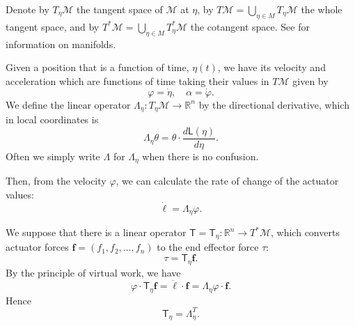 \documentclass[oneside,twocolumn,reqno]{amsart}
\begin{document}
Denote by $T_\eta \mathcal M$ the tangent space of $\mathcal M$ at $\eta$, by $T\mathcal M = \bigcup_{\eta\in M} T_\eta \mathcal M$ the whole tangent space, and by $T^*\mathcal M = \bigcup_{\eta\in M} T^*_\eta \mathcal M$ the cotangent space.  See \cite{lee} for information on manifolds.

Given a position that is a function of time, $\eta(t)$, we have its velocity and acceleration which are functions of time taking their values in $T\mathcal M$ given by
\begin{equation}
\varphi = \dot \eta, \quad
\alpha = \dot \varphi .
\end{equation}
We define the linear operator $\mathsf \Lambda_\eta:T_\eta\mathcal M \to \mathbb R^n$ by the directional derivative, which in local coordinates is
\begin{equation}
\mathsf \Lambda_\eta \theta = \theta \cdot \frac {d \mathsf L(\eta)}{d\eta} .
\end{equation}
Often we simply write $\Lambda$ for $\Lambda_\eta$ when there is no confusion.

Then, from the velocity $\varphi$, we can calculate the rate of change of the actuator values:
\begin{equation}
\label{dot l Lambda phi}
\dot{\bm\ell} = \Lambda_\eta \varphi.
\end{equation}

We suppose that there is a linear operator $\mathsf T = \mathsf T_\eta : \mathbb R^n \to T^*\mathcal M$, which converts actuator forces $\bm f = (f_1,f_2,\dots,f_n)$
to the end effector force $\tau$:
\begin{equation}
\tau = \mathsf T_\eta \bm f.
\end{equation}
By the principle of virtual work, we have
\begin{equation}
\varphi \cdot \mathsf T_\eta \bm f = \dot{\bm\ell} \cdot \bm f = \mathsf\Lambda_\eta \varphi \cdot \bm f.
\end{equation}
Hence
\begin{equation}
\mathsf T_\eta = \mathsf\Lambda_\eta^T .
\end{equation}
\end{document}
